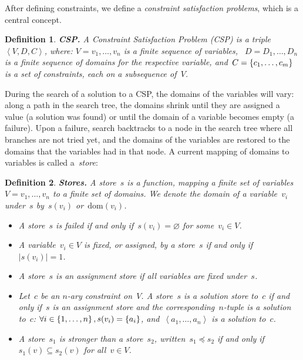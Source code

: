 \documentclass[a4paper,11pt]{article}
\newtheorem{definition}{Definition}
\newcommand{\Dom}[1]{\text{dom}({#1})}
\numberwithin{equation}{section}
\begin{document}
After defining constraints, we define a \emph{constraint satisfaction problems},
which is a central concept.

\begin{definition}
  \textbf{CSP.} A Constraint Satisfaction Problem (CSP) is a 
  triple~$\left<V,D,C\right>$, where:
  $V = v_1, \ldots, v_n$ is a finite sequence of variables,
  ~$D = D_1, \ldots, D_n$ is a finite sequence of domains for the respective variable,
  and~$C = \left\{c_1, \ldots, c_m\right\}$ is a set of constraints, each on a subsequence of~$V$.
\end{definition}

During the search of a solution to a CSP, the domains of the variables will vary: 
along a path in the search tree, the domains shrink
until they are assigned a value (a solution was found) or until the domain
of a variable becomes empty (a failure).
Upon a failure, search backtracks to a node in the search tree
where all branches are not tried yet,
and the domains of the variables are restored to the domains that the variables
had in that node.
A current mapping of domains to variables is called a~\emph{store}:

\begin{definition}
  \textbf{Stores.} A \emph{store}~$s$ is a function, mapping a finite set of
  variables~$V = v_1, \ldots, v_n$ to a finite set of domains. We denote the domain of
  a variable~$v_i$ under~$s$ by~$s(v_i)$ or~$\Dom{v_i}$.
  \begin{itemize}
    \item A store~$s$ is \emph{failed} if and only if~$s(v_i) = \varnothing$ for some~$v_i \in V$.
    \item   A variable~$v_i \in V$ is \emph{fixed}, or \emph{assigned},
      by a store~$s$ if and only if~$|s(v_i)| = 1$. 
    \item A store~$s$ is an \emph{assignment} store if all variables are 
      fixed under~$s$.

    \item Let~$c$ be an $n$-ary constraint on~$V$. A store~$s$ is 
      a \emph{solution store} 
      to~$c$ if and only if~$s$ is an assignment store and the
      corresponding~$n$-tuple is a solution to~$c$:
      $\forall i \in \left\{1,\ldots,n\right\}, s(v_i) = \left\{a_i\right\}$,
      and~$\left<a_1,\ldots,a_n\right>$ is a solution to~$c$.

    \item A store~$s_1$ is \emph{stronger} than a store~$s_2$, 
      written~$s_1 \preceq s_2$ if and only if~$s_1(v) \subseteq s_2(v)$ 
      for all~$v \in V$.
  \end{itemize}

\end{definition}
\end{document}
